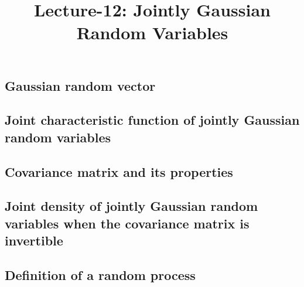 \documentclass[a4paper,10pt,english]{article}
\title{Lecture-12: Jointly Gaussian Random Variables}
\author{}
\begin{document}
\maketitle

\subsection{Gaussian random vector}
\subsection{Joint characteristic function of jointly Gaussian random variables}
\subsection{Covariance matrix and its properties}
\subsection{Joint density of jointly Gaussian random variables when the covariance matrix is invertible}
\subsection{Definition of a random process}
\end{document}
